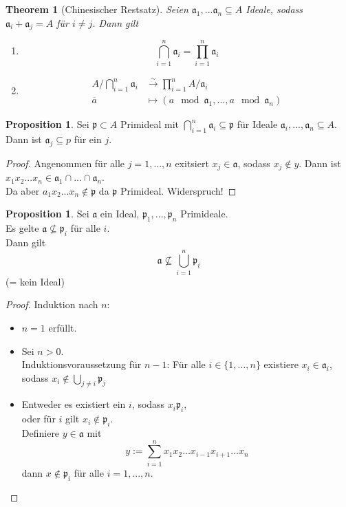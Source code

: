 \documentclass[10pt,a4paper]{article}
\newcommand{\ol}[1]{\overline{#1}}
\newcommand{\isomfunc}{\ensuremath{\xrightarrow{\sim}}}
\newcounter{thm}[section]
\theoremstyle{definition}
\newtheorem{prop}[thm]{Proposition}
\theoremstyle{plain}
\newtheorem{theorem}[thm]{Theorem}
\theoremstyle{remark}
\begin{document}
\begin{theorem}[Chinesischer Restsatz]
	Seien $\mathfrak a_1,...\mathfrak a_n\subseteq A$ Ideale, sodass\\
	$\mathfrak a_i+\mathfrak a_j=A$ für $i\neq j$. Dann gilt
	\begin{enumerate}
		\item \[\bigcap_{i=1}^{n}\mathfrak a_i=\prod_{i=1}^{n}\mathfrak a_i\]
		\item \begin{align*}
		A/\bigcap_{i=1}^n\mathfrak a_i&\isomfunc \prod_{i=1}^nA/\mathfrak a_i\\
		\ol{a}&\mapsto(a\mod\mathfrak a_1,...,a\mod\mathfrak a_n)
		\end{align*}
	\end{enumerate}
\end{theorem}


\begin{prop}
	Sei $\mathfrak p\subset A$ Primideal mit $\bigcap_{i=1}^n\mathfrak a_i\subseteq \mathfrak p$ für Ideale $\mathfrak a_i,...,\mathfrak a_n\subseteq A$.\\
	Dann ist $\mathfrak a_j\subseteq p$ für ein $j$.
\end{prop}
\begin{proof}
	Angenommen für alle $j=1,...,n$ exitsiert $x_j\in\mathfrak a$, sodass $x_j\notin y$. Dann ist $x_1x_2...x_n\in\mathfrak a_1\cap...\cap\mathfrak a_n$.\\
	Da aber $a_1x_2...x_n\notin\mathfrak p$ da $\mathfrak p$ Primideal. Widerspruch!
\end{proof}
\addtocounter{thm}{-1}
\begin{prop}\label{111prop}
	Sei $\mathfrak a$ ein Ideal, $\mathfrak p_1,...,\mathfrak p_n$ Primideale.\\
	Es gelte $\mathfrak a\not\subseteq \mathfrak p_i$ für alle $i$.\\
	Dann gilt 
	\[\mathfrak a\not\subseteq \bigcup_{i=1}^n\mathfrak p_i \]
	(= kein Ideal)
\end{prop}
\begin{proof}
	Induktion nach $n$:
	\begin{itemize}
		\item $n=1$ erfüllt.
		\item Sei $n>0$.\\
		Induktionsvoraussetzung für $n-1$: Für alle $i\in\{1,...,n\}$ existiere $x_i\in\mathfrak a_i$, sodass $x_i\notin\bigcup_{j\neq i}\mathfrak p_j$
		\item Entweder es existiert ein $i$, sodass $x_i\mathfrak p_i$,\\
		oder für $i$ gilt $x_i\notin\mathfrak p_i$.\\
		Definiere $y\in \mathfrak a$ mit
		\[y:=\sum_{i=1}^{n}x_1x_2...x_{i-1}x_{i+1}...x_n\]
		dann $x\notin\mathfrak p_i$ für alle $i=1,...,n$.
	\end{itemize}
\end{proof}
\end{document}
